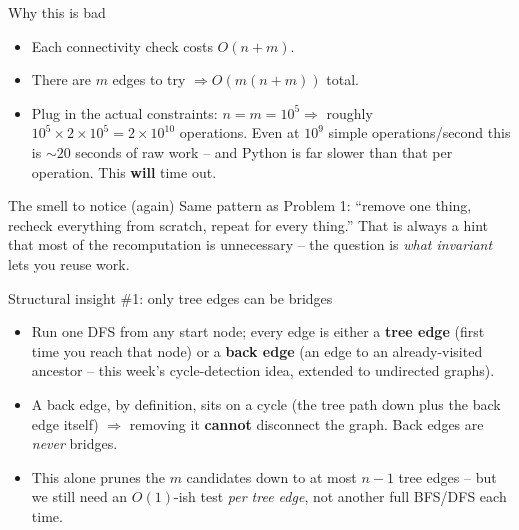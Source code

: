 \documentclass[11pt,aspectratio=169]{beamer}
\begin{document}
\begin{frame}{Why this is bad}
  \begin{itemize}
    \item Each connectivity check costs $O(n+m)$.
    \item There are $m$ edges to try $\Rightarrow O(m(n+m))$ total.
    \item Plug in the actual constraints: $n = m = 10^5 \Rightarrow$ roughly
    $10^5 \times 2 \times 10^5 = 2\times10^{10}$ operations. Even at $10^9$ simple
    operations/second this is $\sim 20$ seconds of raw work -- and Python is far slower
    than that per operation. This \textbf{will} time out.
  \end{itemize}
  \begin{alertblock}{The smell to notice (again)}
    Same pattern as Problem 1: ``remove one thing, recheck everything from scratch,
    repeat for every thing.'' That is always a hint that most of the recomputation is
    unnecessary -- the question is \emph{what invariant} lets you reuse work.
  \end{alertblock}
\end{frame}

\begin{frame}{Structural insight \#1: only tree edges can be bridges}
  \begin{itemize}
    \item Run one DFS from any start node; every edge is either a \textbf{tree edge}
    (first time you reach that node) or a \textbf{back edge} (an edge to an already-visited
    ancestor -- this week's cycle-detection idea, extended to undirected graphs).
    \item A back edge, by definition, sits on a cycle (the tree path down plus the back
    edge itself) $\Rightarrow$ removing it \textbf{cannot} disconnect the graph. Back
    edges are \emph{never} bridges.
    \item This alone prunes the $m$ candidates down to at most $n-1$ tree edges -- but we
    still need an $O(1)$-ish test \emph{per tree edge}, not another full BFS/DFS each
    time.
  \end{itemize}
\end{frame}
\end{document}
